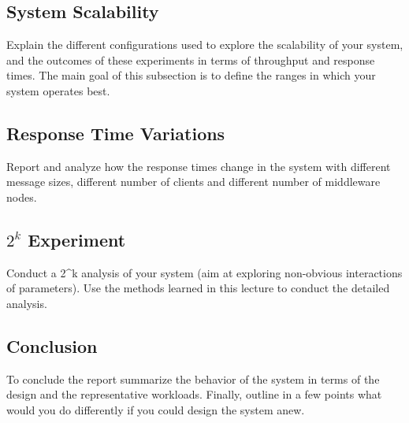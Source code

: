 \documentclass[11pt]{article}
\begin{document}
\subsection{System Scalability}\label{sec:system-scalability}

Explain the different configurations used to explore the scalability of
your system, and the outcomes of these experiments in terms of
throughput and response times. The main goal of this subsection is to
define the ranges in which your system operates best.

\subsection{Response Time Variations}\label{sec:response-time-variations}

Report and analyze how the response times change in the system with
different message sizes, different number of clients and different
number of middleware nodes.

\subsection{$2^k$ Experiment}\label{sec:k-experiment}

Conduct a 2\^{}k analysis of your system (aim at exploring non-obvious
interactions of parameters). Use the methods learned in this lecture to
conduct the detailed analysis.

\subsection{Conclusion}\label{sec:conclusion}

To conclude the report summarize the behavior of the system in terms of
the design and the representative workloads. Finally, outline in a few
points what would you do differently if you could design the system
anew.
\end{document}
